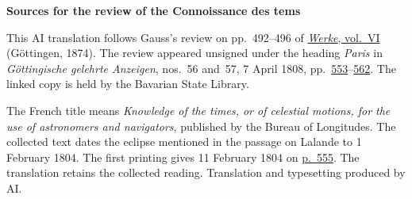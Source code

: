 \clearpage\thispagestyle{empty}
\begin{center}\textbf{Sources for the review of the Connoissance des tems}\end{center}
\noindent This AI translation follows Gauss’s review on pp.~492--496 of \href{https://gdz.sub.uni-goettingen.de/id/PPN236007467}{\textit{Werke}, vol.~VI} (Göttingen, 1874). The review appeared unsigned under the heading \emph{Paris} in \textit{Göttingische gelehrte Anzeigen}, nos.~56 and~57, 7 April 1808, pp.~\href{https://api.digitale-sammlungen.de/iiif/image/v2/bsb10538673_00559/full/1800,/0/default.jpg}{553}--\href{https://api.digitale-sammlungen.de/iiif/image/v2/bsb10538673_00568/full/1800,/0/default.jpg}{562}. The linked copy is held by the Bavarian State Library.
\par\smallskip\noindent The French title means \emph{Knowledge of the times, or of celestial motions, for the use of astronomers and navigators}, published by the Bureau of Longitudes. The collected text dates the eclipse mentioned in the passage on Lalande to 1 February 1804. The first printing gives 11 February 1804 on \href{https://api.digitale-sammlungen.de/iiif/image/v2/bsb10538673_00561/full/1800,/0/default.jpg}{p.~555}. The translation retains the collected reading. Translation and typesetting produced by AI.
\clearpage
